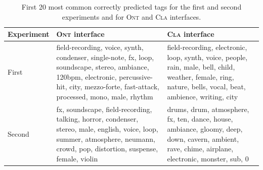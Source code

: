 \begin{table}
\begin{center}
\footnotesize
\begin{tabular}{@{}p{2cm}p{5cm}p{5cm}@{}}
\toprule
\textbf{Experiment} & \textsc{Ont} \textbf{interface} & \textsc{Cla} \textbf{interface} \\
\midrule
First & field-recording, voice, synth, condenser, single-note, fx, loop, soundscape, stereo, ambiance, 120bpm, electronic, percussive-hit, city, mezzo-forte, fast-attack, processed, mono, male, rhythm & field-recording, electronic, loop, synth, voice, people, rain, male, bell, child, weather, female, ring, nature, bells, vocal, beat, ambience, writing, city \\
Second & fx, soundscape, field-recording, talking, horror, condenser, stereo, male, english, voice, loop, summer, atmosphere, neumann, crowd, pop, distortion, suspense, female, violin & drums, drum, atmosphere, fx, ten, dance, house, ambiance, gloomy, deep, down, cavern, ambient, rave, chime, airplane, electronic, monster, sub, 0 \\
\bottomrule
\end{tabular}
\caption[Most common correctly predicted tags]{First 20 most common correctly predicted tags for the first and second experiments and for \textsc{Ont} and \textsc{Cla} interfaces. 
}
\label{tab:ontology_most_correctly_predicted_tags}
\end{center}
\end{table}

